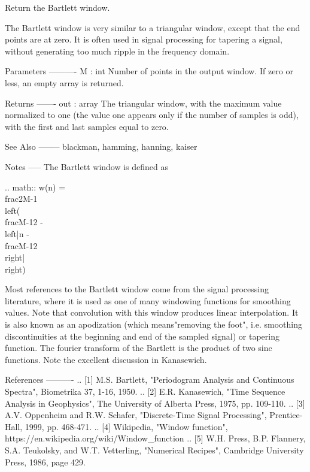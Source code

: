 \begin{DoxyVerb}Return the Bartlett window.

The Bartlett window is very similar to a triangular window, except
that the end points are at zero.  It is often used in signal
processing for tapering a signal, without generating too much
ripple in the frequency domain.

Parameters
----------
M : int
    Number of points in the output window. If zero or less, an
    empty array is returned.

Returns
-------
out : array
    The triangular window, with the maximum value normalized to one
    (the value one appears only if the number of samples is odd), with
    the first and last samples equal to zero.

See Also
--------
blackman, hamming, hanning, kaiser

Notes
-----
The Bartlett window is defined as

.. math:: w(n) = \\frac{2}{M-1} \\left(
          \\frac{M-1}{2} - \\left|n - \\frac{M-1}{2}\\right|
          \\right)

Most references to the Bartlett window come from the signal
processing literature, where it is used as one of many windowing
functions for smoothing values.  Note that convolution with this
window produces linear interpolation.  It is also known as an
apodization (which means"removing the foot", i.e. smoothing
discontinuities at the beginning and end of the sampled signal) or
tapering function. The fourier transform of the Bartlett is the product
of two sinc functions.
Note the excellent discussion in Kanasewich.

References
----------
.. [1] M.S. Bartlett, "Periodogram Analysis and Continuous Spectra",
       Biometrika 37, 1-16, 1950.
.. [2] E.R. Kanasewich, "Time Sequence Analysis in Geophysics",
       The University of Alberta Press, 1975, pp. 109-110.
.. [3] A.V. Oppenheim and R.W. Schafer, "Discrete-Time Signal
       Processing", Prentice-Hall, 1999, pp. 468-471.
.. [4] Wikipedia, "Window function",
       https://en.wikipedia.org/wiki/Window_function
.. [5] W.H. Press,  B.P. Flannery, S.A. Teukolsky, and W.T. Vetterling,
       "Numerical Recipes", Cambridge University Press, 1986, page 429.


\end{DoxyVerb}
